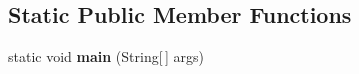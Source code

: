 \subsection*{Static Public Member Functions}
\begin{DoxyCompactItemize}
\item 
\hypertarget{classcom_1_1shephertz_1_1app42_1_1paas_1_1sdk_1_1csharp_1_1geo_1_1_geo_response_builder_a5826dc8af5ebb00ec972891b8fe69ec9}{static void {\bfseries main} (String\mbox{[}$\,$\mbox{]} args)}\label{classcom_1_1shephertz_1_1app42_1_1paas_1_1sdk_1_1csharp_1_1geo_1_1_geo_response_builder_a5826dc8af5ebb00ec972891b8fe69ec9}

\end{DoxyCompactItemize}
